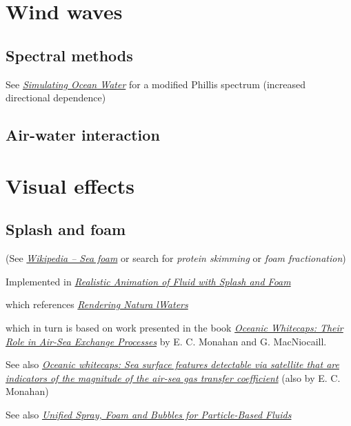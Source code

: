 \section{Wind waves}

\subsection{Spectral methods}

See \textit{\href{http://graphics.ucsd.edu/courses/rendering/2005/jdewall/tessendorf.pdf}{Simulating Ocean Water}} for a modified Phillis spectrum (increased directional dependence)

\subsection{Air-water interaction}

\section{Visual effects}

\subsection{Splash and foam}

(See \textit{\href{http://en.wikipedia.org/wiki/Sea_foam}{Wikipedia -- Sea foam}} or search for \textit{protein skimming} or \textit{foam fractionation})

Implemented in \textit{\href{http://nguyendangbinh.org/Proceedings/Eurographics/2003/cgf/volume22/issue3/paper127/paper127.pdf}{Realistic Animation of Fluid with Splash and Foam}}

which references \textit{\href{http://citeseerx.ist.psu.edu/viewdoc/download?doi=10.1.1.4.6262&rep=rep1&type=pdf}{Rendering Natura lWaters}}

which in turn is based on work presented in the book \textit{\href{http://books.google.se/books?id=xuwFz1bPTHgC}{Oceanic Whitecaps: Their Role in Air-Sea Exchange Processes}} by E. C. Monahan and G. MacNiocaill.

See also \textit{\href{http://www.ias.ac.in/jess/sep2002/Ps18.pdf}{Oceanic whitecaps: Sea surface features detectable via satellite that are indicators of the magnitude of the air-sea gas transfer coefficient}} (also by  E. C. Monahan)

See also \textit{\href{http://cg.informatik.uni-freiburg.de/publications/2012_CGI_sprayFoamBubbles.pdf}{Unified Spray, Foam and Bubbles for Particle-Based Fluids}}


